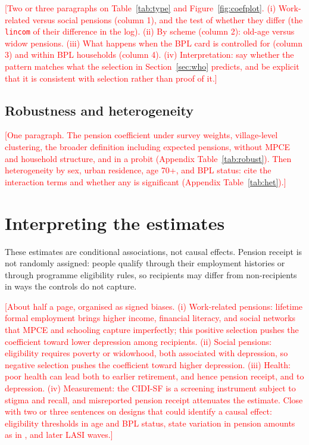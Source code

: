 \documentclass[11pt]{article}
\newcommand{\todo}[1]{\textcolor{red}{[#1]}}
\begin{document}
\todo{Two or three paragraphs on Table~\ref{tab:type} and
Figure~\ref{fig:coefplot}. (i) Work-related versus social pensions (column 1),
and the test of whether they differ (the \texttt{lincom} of their difference
in the log). (ii) By scheme (column 2): old-age versus widow pensions. (iii)
What happens when the BPL card is controlled for (column 3) and within BPL
households (column 4). (iv) Interpretation: say whether the pattern matches
what the selection in Section~\ref{sec:who} predicts, and be explicit that it
is consistent with selection rather than proof of it.}

\subsection{Robustness and heterogeneity}

\todo{One paragraph. The pension coefficient under survey weights,
village-level clustering, the broader definition including expected pensions,
without MPCE and household structure, and in a probit
(Appendix Table~\ref{tab:robust}). Then heterogeneity by sex, urban residence,
age 70+, and BPL status: cite the interaction terms and whether any is
significant (Appendix Table~\ref{tab:het}).}

\section{Interpreting the estimates}

These estimates are conditional associations, not causal effects. Pension
receipt is not randomly assigned: people qualify through their employment
histories or through programme eligibility rules, so recipients may differ from
non-recipients in ways the controls do not capture.

\todo{About half a page, organised as signed biases. (i) Work-related
pensions: lifetime formal employment brings higher income, financial literacy,
and social networks that MPCE and schooling capture imperfectly; this positive
selection pushes the coefficient toward lower depression among recipients.
(ii) Social pensions: eligibility requires poverty or widowhood, both
associated with depression, so negative selection pushes the coefficient
toward higher depression. (iii) Health: poor health can lead both to earlier
retirement, and hence pension receipt, and to depression. (iv) Measurement:
the CIDI-SF is a screening instrument subject to stigma and recall, and
misreported pension receipt attenuates the estimate. Close with two or three
sentences on designs that could identify a causal effect: eligibility
thresholds in age and BPL status, state variation in pension amounts as in
\citet{Kaushal2014}, and later LASI waves.}
\end{document}
